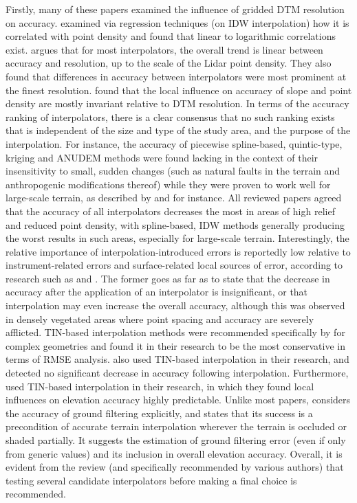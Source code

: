 Firstly, many of these papers examined the influence of gridded DTM resolution on accuracy. \cite{chow_hodgson_2009} examined via regression techniques (on IDW interpolation) how it is correlated with point density and found that linear to logarithmic correlations exist. \cite{guo_etal_2010} argues that for most interpolators, the overall trend is linear between accuracy and resolution, up to the scale of the Lidar point density. They also found that differences in accuracy between interpolators were most prominent at the finest resolution. \cite{bater_coops_2009} found that the local influence on accuracy of slope and point density are mostly invariant relative to DTM resolution. In terms of the accuracy ranking of interpolators, there is a clear consensus that no such ranking exists that is independent of the size and type of the study area, and the purpose of the interpolation. For instance, the accuracy of piecewise spline-based, quintic-type, kriging and ANUDEM methods were found lacking in the context of their insensitivity to small, sudden changes (such as natural faults in the terrain and anthropogenic modifications thereof) while they were proven to work well for large-scale terrain, as described by \cite{bater_coops_2009} and \cite{guo_etal_2010} for instance. All reviewed papers agreed that the accuracy of all interpolators decreases the most in areas of high relief and reduced point density, with spline-based, IDW methods generally producing the worst results in such areas, especially for large-scale terrain. Interestingly, the relative importance of interpolation-introduced errors is reportedly low relative to instrument-related errors and surface-related local sources of error, according to research such as \cite{hodgson_breshanan_2004} and \cite{aguilar_etal_2010}. The former goes as far as to state that the decrease in accuracy after the application of an interpolator is insignificant, or that interpolation may even increase the overall accuracy, although this was observed in densely vegetated areas where point spacing and accuracy are severely afflicted. TIN-based interpolation methods were recommended specifically by \cite{bater_coops_2009} for complex geometries and found it in their research to be the most conservative in terms of RMSE analysis. \cite{hodgson_breshanan_2004} also used TIN-based interpolation in their research, and detected no significant decrease in accuracy following interpolation. Furthermore, \cite{peng_shih_2006} used TIN-based interpolation in their research, in which they found local influences on elevation accuracy highly predictable. Unlike most papers, \cite{aguilar_etal_2010} considers the accuracy of ground filtering explicitly, and states that its success is a precondition of accurate terrain interpolation wherever the terrain is occluded or shaded partially. It suggests the estimation of ground filtering error (even if only from generic values) and its inclusion in overall elevation accuracy. Overall, it is evident from the review (and specifically recommended by various authors) that testing several candidate interpolators before making a final choice is recommended.

